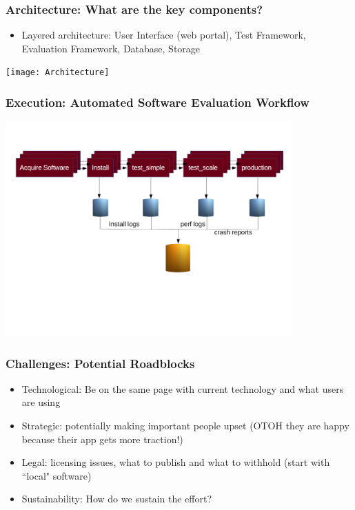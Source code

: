 \documentclass[hyperref={pdfpagelabels=false},12pt]{beamer}
\begin{document}
\begin{frame}
\frametitle{Architecture: What are the key components?}
\begin{itemize}
\item 
Layered architecture: User Interface (web portal), Test Framework, Evaluation Framework, Database, Storage
\end{itemize}
\texttt{[image: Architecture]}
\end{frame}

\begin{frame}
\frametitle{Execution: Automated Software Evaluation Workflow}
\begin{center}
\includegraphics[width=11cm]{workflow}
\end{center}
\end{frame}

\begin{frame}
\frametitle{Challenges: Potential Roadblocks}
\begin{itemize}
\itemsep1em
\item
Technological: Be on the same page with current technology and what users are using
\item 
Strategic: potentially making important people upset (OTOH they are happy because their app gets more traction!)
\item
Legal: licensing issues, what to publish and what to withhold (start with ``local" software)
\item
 Sustainability: How do we sustain the effort?
\end{itemize}
\end{frame}
\end{document}
